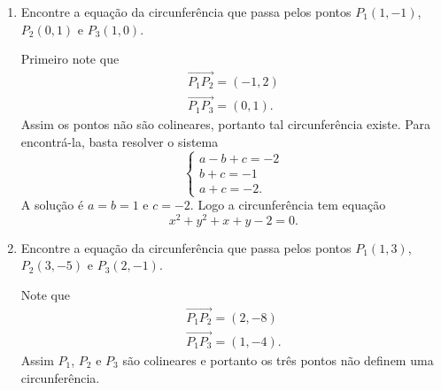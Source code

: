 \begin{exemplos}
\begin{enumerate}
\begin{solucao}
                  Agora, como
                  \[
                      -2x_0 = a,\quad -2y_0 = b,\quad x_0^2 + y_0^2 - r^2 = c
                  \]
                  segue que
                  \[
                      x_0 = 13/2,\quad y_0 = -1/2 \quad\mbox{e}\quad r^2 = 65/2.
                  \]
                  Assim a equação cartesiana da circunferência será
                  \[
                      \left(x - \dfrac{13}{2}\right)^2 + \left(y + \dfrac{1}{2}\right)^2 = \dfrac{65}{2}.
                  \]
                  As equações paramétricas são
                  \[
                      \begin{cases}
                          x = \dfrac{13}{2} + \dfrac{\sqrt{65}}{\sqrt{2}}\cos\beta \\
                          y = -\dfrac{1}{2} + \dfrac{\sqrt{65}}{\sqrt{2}}\sin\beta \\
                      \end{cases}, \beta \in [0,2\pi].
                  \]
              \end{solucao}
        \item Encontre a equação da circunferência que passa pelos pontos $P_1(1,-1)$, $P_2(0,1)$ e $P_3(1,0)$.
              \begin{solucao}
                  Primeiro note que
                  \begin{align*}
                      \vec{P_1P_2} = (-1,2) \\
                      \vec{P_1P_3} = (0,1).
                  \end{align*}
                  Assim os pontos não são colineares, portanto tal circunferência existe. Para encontrá-la, basta resolver o sistema
                  \[
                      \begin{cases}
                          a - b + c = -2 \\
                          b + c = -1     \\
                          a + c = -2.
                      \end{cases}
                  \]
                  A solução é $a = b = 1$ e $c = -2$. Logo a circunferência tem equação
                  \[
                      x^2 + y^2 + x + y - 2 = 0.
                  \]
              \end{solucao}
        \item Encontre a equação da circunferência que passa pelos pontos $P_1(1,3)$, $P_2(3,-5)$ e $P_3(2,-1)$.
              \begin{solucao}
                  Note que
                  \begin{align*}
                      \vec{P_1P_2} = (2, -8) \\
                      \vec{P_1P_3} = (1, -4).
                  \end{align*}
                  Assim $P_1$, $P_2$ e $P_3$ são colineares e portanto os três pontos não definem uma circunferência.
              \end{solucao}
    \end{enumerate}
\end{exemplos}

